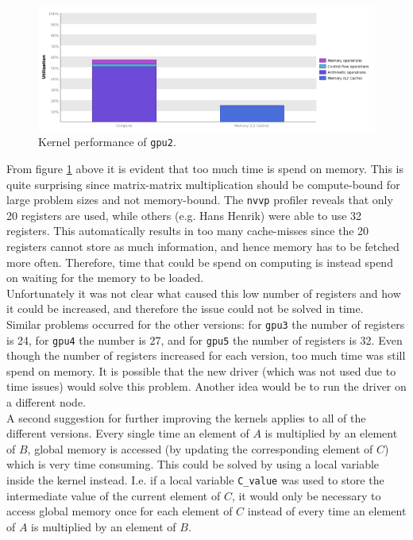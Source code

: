 \begin{figure}[H]
    \centering
    \includegraphics{contents/pics_1/nvvp_gpu.PNG}
    \caption{Kernel performance of \texttt{gpu2}.}
    \label{fig:nvvp_gpu}
\end{figure}

\noindent From figure \ref{fig:nvvp_gpu} above it is evident that too much time is spend on memory. This is quite surprising since matrix-matrix multiplication should be compute-bound for large problem sizes and not memory-bound. The \texttt{nvvp} profiler reveals that only 20 registers are used, while others (e.g. Hans Henrik) were able to use 32 registers. This automatically results in too many cache-misses since the 20 registers cannot store as much information, and hence memory has to be fetched more often. Therefore, time that could be spend on computing is instead spend on waiting for the memory to be loaded.\\

\noindent Unfortunately it was not clear what caused this low number of registers and how it could be increased, and therefore the issue could not be solved in time.\\

\noindent Similar problems occurred for the other versions: for \texttt{gpu3} the number of registers is 24, for \texttt{gpu4} the number is 27, and for \texttt{gpu5} the number of registers is 32. Even though the number of registers increased for each version, too much time was still spend on memory. It is possible that the new driver (which was not used due to time issues) would solve this problem. Another idea would be to run the driver on a different node.\\

\noindent A second suggestion for further improving the kernels applies to all of the different versions. Every single time an element of $A$ is multiplied by an element of $B$, global memory is accessed (by updating the corresponding element of $C$) which is very time consuming. This could be solved by using a local variable inside the kernel instead. I.e. if a local variable \texttt{C\_value} was used to store the intermediate value of the current element of $C$, it would only be necessary to access global memory once for each element of $C$ instead of every time an element of $A$ is multiplied by an element of $B$.\\

